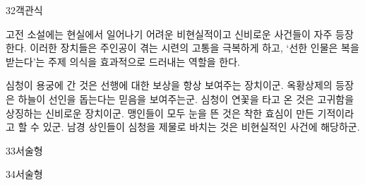 \documentclass[fs9,seriesRus]{korfarm-base}
\begin{document}
\begin{kfQBlock}{32}{객관식}
\begin{kfEvidence}고전 소설에는 현실에서 일어나기 어려운 비현실적이고 신비로운 사건들이 자주 등장한다. 이러한 장치들은 주인공이 겪는 시련의 고통을 극복하게 하고, ‘선한 인물은 복을 받는다’는 주제 의식을 효과적으로 드러내는 역할을 한다.\end{kfEvidence}
\begin{kfChoices}
\kfChoice 심청이 용궁에 간 것은 선행에 대한 보상을 항상 보여주는 장치이군.
\kfChoice 옥황상제의 등장은 하늘이 선인을 돕는다는 믿음을 보여주는군.
\kfChoice 심청이 연꽃을 타고 온 것은 고귀함을 상징하는 신비로운 장치이군.
\kfChoice 맹인들이 모두 눈을 뜬 것은 착한 효심이 만든 기적이라고 할 수 있군.
\kfChoice 남경 상인들이 심청을 제물로 바치는 것은 비현실적인 사건에 해당하군.
\end{kfChoices}
\end{kfQBlock}
\begin{kfQBlock}{33}{서술형}
\end{kfQBlock}
\begin{kfQBlock}{34}{서술형}
\end{kfQBlock}
\kfEndMC


\end{document}
